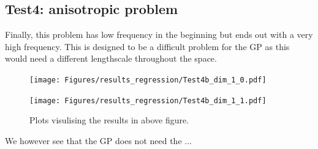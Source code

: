 \subsection{Test4: anisotropic problem}
Finally, this problem has low frequency in the beginning but ends out with a very high frequency.
This is designed to be a difficult problem for the GP as this would need a different lengthscale
throughout the space.

\begin{figure}[H]
  \centering
  \begin{minipage}[b]{0.49\textwidth}
   \texttt{[image: Figures/results\_regression/Test4b\_dim\_1\_0.pdf]}
  \end{minipage}
  \hfill
  \begin{minipage}[b]{0.49\textwidth}
    \texttt{[image: Figures/results\_regression/Test4b\_dim\_1\_1.pdf]}
   \end{minipage}
  \caption{Plots visulising the results in above figure.}
  \label{Test4_reg_plot}
\end{figure}

We however see that the GP does not need the ...


